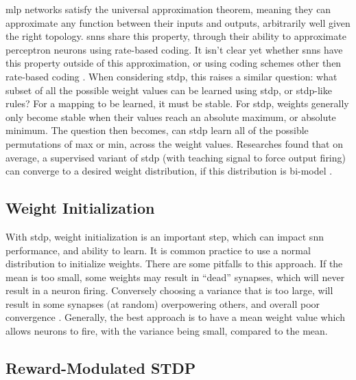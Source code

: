 

    \Gls{mlp} networks satisfy the universal approximation theorem, meaning they
    can approximate any function between their inputs and outputs, arbitrarily
    well given the right topology. \Glspl{snn} share this property, through
    their ability to approximate perceptron neurons using rate-based coding. It
    isn't clear yet whether \glspl{snn} have this property outside of this
    approximation, or using coding schemes other then rate-based coding
    \parencite{legenstein_2005}. When considering \gls{stdp}, this raises a similar
    question: what subset of all the possible weight values can be learned using
    \gls{stdp}, or \gls{stdp}-like rules? For a mapping to be learned, it must be
    stable. For \gls{stdp}, weights generally only become stable when their
    values reach an absolute maximum, or absolute minimum. The question then
    becomes, can \gls{stdp} learn all of the possible permutations of max or
    min, across the weight values. Researches found that on average, a
    supervised variant of \gls{stdp} (with teaching signal to force output
    firing) can converge to a desired weight distribution, if this distribution
    is bi-model \parencite{legenstein_2005}.

    \subsection{Weight Initialization}
    
    With \gls{stdp}, weight initialization is an important step, which can
    impact \gls{snn} performance, and ability to learn. It is common practice to
    use a normal distribution to initialize weights. There are some pitfalls to
    this approach. If the mean is too small, some weights may result in
    ``dead'' synapses, which will never result in a neuron firing. Conversely
    choosing a variance that is too large, will result in some
    synapses (at random) overpowering others, and overall poor convergence
    \parencite{vigneron_2020}. Generally, the best approach is to have a mean
    weight value which allows neurons to fire, with the variance being small,
    compared to the mean.

    \subsection{Reward-Modulated STDP}
    
